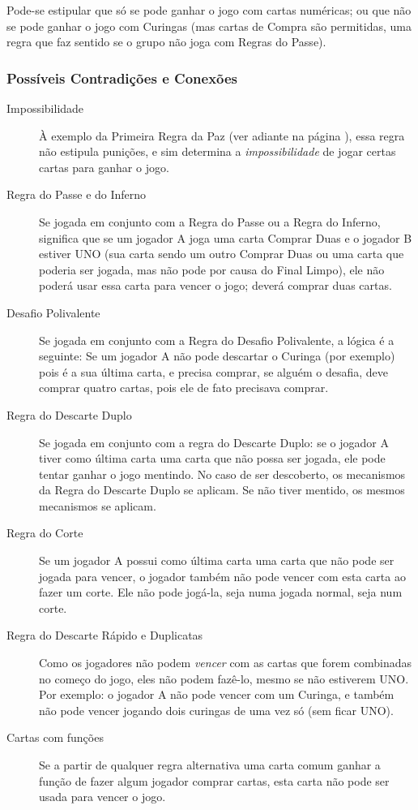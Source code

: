 Pode-se estipular que só se pode ganhar o jogo com cartas numéricas; ou que não se pode ganhar o jogo com Curingas (mas cartas de Compra são permitidas, uma regra que faz sentido se o grupo não joga com Regras do Passe).

\subsubsection{Possíveis Contradições e Conexões}

\begin{description}
\item[Impossibilidade]{À exemplo da Primeira Regra da Paz (ver adiante na página \pageref{primeirapaz}), essa regra não estipula punições, e sim determina a \emph{impossibilidade} de jogar certas cartas para ganhar o jogo.}
\item[Regra do Passe e do Inferno]{Se jogada em conjunto com a Regra do Passe ou a Regra do Inferno, significa que se um jogador A joga uma carta Comprar Duas e o jogador B estiver UNO (sua carta sendo um outro Comprar Duas ou uma carta que poderia ser jogada, mas não pode por causa do Final Limpo), ele não poderá usar essa carta para vencer o jogo; deverá comprar duas cartas.}
\item[Desafio Polivalente]{Se jogada em conjunto com a Regra do Desafio Polivalente, a lógica é a seguinte: Se um jogador A não pode descartar o Curinga (por exemplo) pois é a sua última carta, e precisa comprar, se alguém o desafia, deve comprar quatro cartas, pois ele de fato precisava comprar.}
\item[Regra do Descarte Duplo]{Se jogada em conjunto com a regra do Descarte Duplo: se o jogador A tiver como última carta uma carta que não possa ser jogada, ele pode tentar ganhar o jogo mentindo. No caso de ser descoberto, os mecanismos da Regra do Descarte Duplo se aplicam. Se não tiver mentido, os mesmos mecanismos se aplicam.}
\item[Regra do Corte]{Se um jogador A possui como última carta uma carta que não pode ser jogada para vencer, o jogador também não pode vencer com esta carta ao fazer um corte. Ele não pode jogá-la, seja numa jogada normal, seja num corte.}
\item[Regra do Descarte Rápido e Duplicatas]{Como os jogadores não podem \emph{vencer} com as cartas que forem combinadas no começo do jogo, eles não podem fazê-lo, mesmo se não estiverem UNO. Por exemplo: o jogador A não pode vencer com um Curinga, e também não pode vencer jogando dois curingas de uma vez só (sem ficar UNO).}
\item[Cartas com funções]{Se a partir de qualquer regra alternativa uma carta comum ganhar a função de fazer algum jogador comprar cartas, esta carta não pode ser usada para vencer o jogo.}
\end{description}


